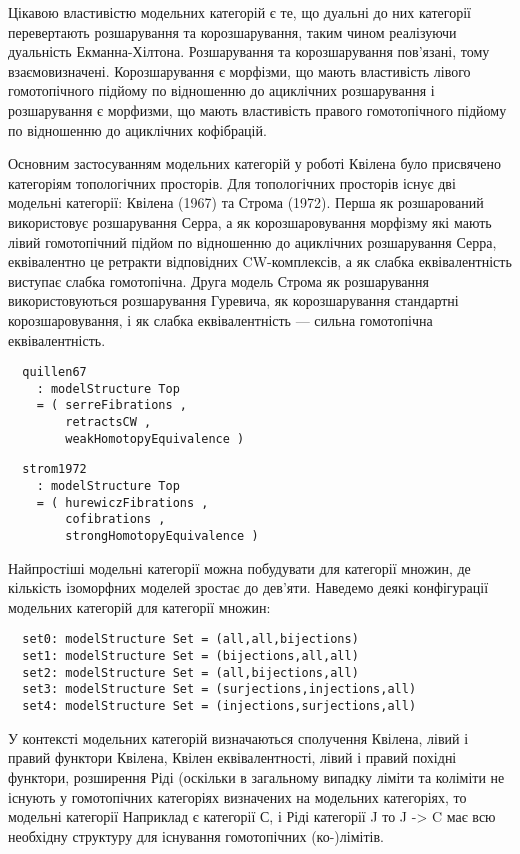 Цікавою властивістю модельних категорій є те, що дуальні до них
категорії перевертають розшарування та корозшарування, таким чином
реалізуючи дуальність Екманна-Хілтона. Розшарування та корозшарування
пов'язані, тому взаємовизначені. Корозшарування є морфізми, що мають
властивість лівого гомотопічного підйому по відношенню до ациклічних
розшарування і розшарування є морфизми, що мають властивість правого
гомотопічного підйому по відношенню до ациклічних кофібрацій.

Основним застосуванням модельних категорій у роботі Квілена було
присвячено категоріям топологічних просторів. Для топологічних
просторів існує дві модельні категорії: Квілена (1967) та Строма (1972).
Перша як розшарований використовує розшарування Серра, а як корозшаровування
морфізму які мають лівий гомотопічний підйом по відношенню до ациклічних
розшарування Серра, еквівалентно це ретракти відповідних CW-комплексів,
а як слабка еквівалентність виступає слабка гомотопічна. Друга модель
Строма як розшарування використовуються розшарування Гуревича, як
корозшарування стандартні корозшаровування, і як слабка еквівалентність ---
сильна гомотопічна еквівалентність.

\begin{lstlisting}
  quillen67
    : modelStructure Top
    = ( serreFibrations ,
        retractsCW ,
        weakHomotopyEquivalence )
\end{lstlisting}

\newpage
\begin{lstlisting}
  strom1972
    : modelStructure Top
    = ( hurewiczFibrations ,
        cofibrations ,
        strongHomotopyEquivalence )
\end{lstlisting}
    
Найпростіші модельні категорії можна побудувати для категорії множин,
де кількість ізоморфних моделей зростає до дев'яти. Наведемо деякі
конфігурації модельних категорій для категорії множин:

\begin{lstlisting}
  set0: modelStructure Set = (all,all,bijections)
  set1: modelStructure Set = (bijections,all,all)
  set2: modelStructure Set = (all,bijections,all)
  set3: modelStructure Set = (surjections,injections,all)
  set4: modelStructure Set = (injections,surjections,all)
\end{lstlisting}
    
У контексті модельних категорій визначаються сполучення Квілена,
лівий і правий функтори Квілена, Квілен еквівалентності, лівий і
правий похідні функтори, розширення Ріді (оскільки в загальному
випадку ліміти та коліміти не існують у гомотопічних категоріях
визначених на модельних категоріях, то модельні категорії Наприклад
є категорії С, і Ріді категорії J то J -> C має всю необхідну структуру
для існування гомотопічних (ко-)лімітів.

